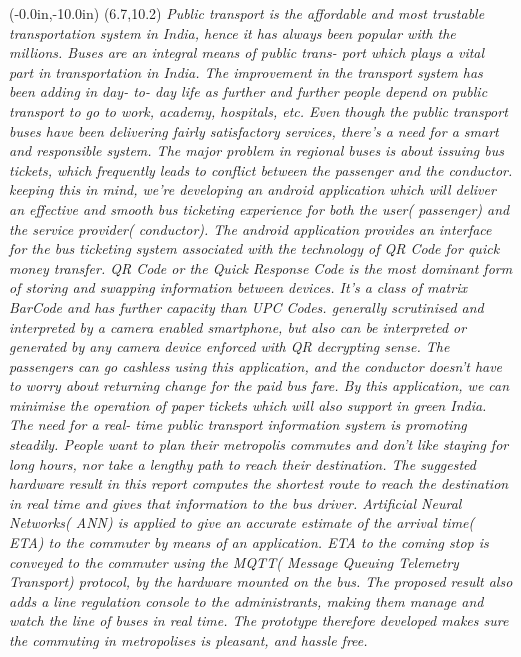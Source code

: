 \documentclass{SNJB}
\begin{document}
\newpage
\thisfancyput(-0.0in,-10.0in){
\setlength{\unitlength}{1in}\framebox(6.7,10.2)}
\emph{
Public transport is the affordable and most trustable transportation system in India, hence it has always been popular with the millions. Buses are an integral means of public trans- port which plays a vital part in transportation in India. The improvement in the transport system has been adding in day- to- day life as further and further people depend on public transport to go to work, academy, hospitals, etc. Even though the public transport buses have been delivering fairly satisfactory services, there's a need for a smart and responsible system. The major problem in regional buses is about issuing bus tickets, which frequently leads to conflict between the passenger and the conductor. keeping this in mind, we're developing an android application which will deliver an effective and smooth bus ticketing experience for both the user( passenger) and the service provider( conductor). The android application provides an interface for the bus ticketing system associated with the technology of QR Code for quick money transfer. QR Code or the Quick Response Code is the most dominant form of storing and swapping information between devices. It’s a class of matrix BarCode and has further capacity than UPC Codes. generally scrutinised and interpreted by a camera enabled smartphone, but also can be interpreted or generated by any camera device enforced with QR decrypting sense. The passengers can go cashless using this application, and the conductor doesn't have to worry about returning change for the paid bus fare. By this application, we can minimise the operation of paper tickets which will also support in green India.
The need for a real- time public transport information system is promoting steadily. People want to plan their metropolis commutes and don't like staying for long hours, nor take a lengthy path to reach their destination. The suggested hardware result in this report computes the shortest route to reach the destination in real time and gives that information to the bus driver. Artificial Neural Networks( ANN) is applied to give an accurate estimate of the arrival time( ETA) to the commuter by means of an application. ETA to the coming stop is conveyed to the commuter using the MQTT( Message Queuing Telemetry Transport) protocol, by the hardware mounted on the bus. The proposed result also adds a line regulation console to the administrants, making them manage and watch the line of buses in real time. The prototype therefore developed makes sure the commuting in metropolises is pleasant, and hassle free.
}
\end{document}
